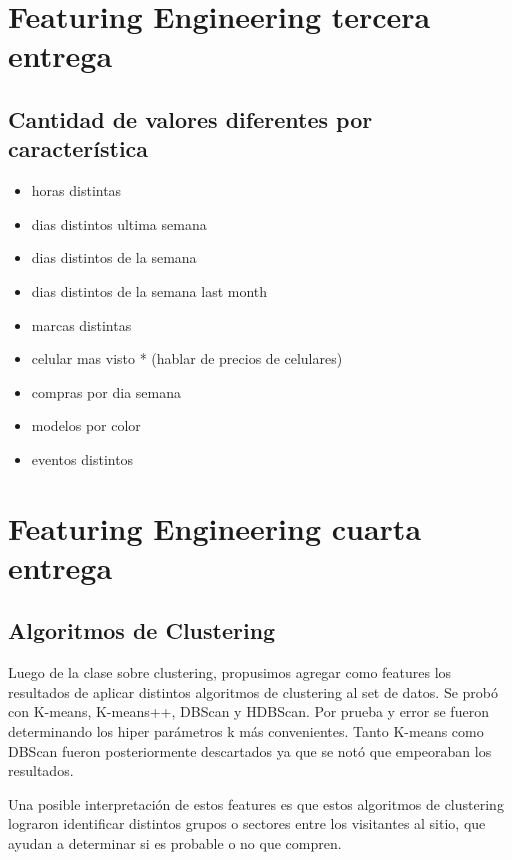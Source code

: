 \documentclass[a4paper ,12pt]{article}
\begin{document}
\section{Featuring Engineering tercera entrega}

\subsection{Cantidad de valores diferentes por característica}

\begin{itemize}
	\item horas distintas

	\item dias distintos ultima semana

	\item dias distintos de la semana

	\item dias distintos de la semana last month

	\item marcas distintas

	\item celular mas visto * (hablar de precios de celulares)

	\item compras por dia semana

	\item modelos por color

	\item eventos distintos

\end{itemize}

\section{Featuring Engineering cuarta entrega}
\subsection{Algoritmos de Clustering}

Luego de la clase sobre clustering, propusimos agregar como features los resultados de aplicar distintos algoritmos de clustering al set de datos. Se probó con K-means, K-means++, DBScan y HDBScan. Por prueba y error se fueron determinando los hiper parámetros k más convenientes. Tanto K-means como DBScan fueron posteriormente descartados ya que se notó que empeoraban los resultados.

Una posible interpretación de estos features es que estos algoritmos de clustering lograron identificar distintos grupos o sectores entre los visitantes al sitio, que ayudan a determinar si es probable o no que compren.
\end{document}
